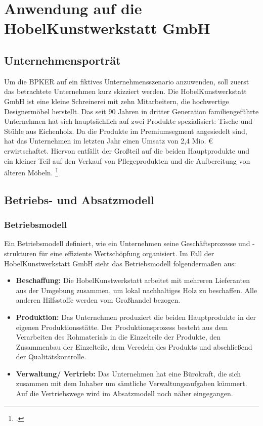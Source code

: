 \chapter{Anwendung auf die HobelKunstwerkstatt GmbH}

\section{Unternehmensporträt}

Um die BPKER auf ein fiktives Unternehmensszenario anzuwenden, soll zuerst das betrachtete Unternehmen kurz skizziert werden. Die HobelKunstwerkstatt GmbH ist eine kleine Schreinerei mit zehn Mitarbeitern, die hochwertige Designermöbel herstellt. Das seit 90 Jahren in dritter Generation familiengeführte Unternehmen hat sich hauptsächlich auf zwei Produkte spezialisiert: Tische und Stühle aus Eichenholz. Da die Produkte im Premiumsegment angesiedelt sind, hat das Unternehmen im letzten Jahr einen Umsatz von 2,4 Mio. {\euro} erwirtschaftet. Hiervon entfällt der Gro{\ss}teil auf die beiden Hauptprodukte und ein kleiner Teil auf den Verkauf von Pflegeprodukten und die Aufbereitung von älteren Möbeln. \footcite[Vgl.][Abfrage zu einem Unternehmensporträt für eine Case Study zur BPKER]{openai2022}

\section{Betriebs- und Absatzmodell}

\subsection{Betriebsmodell}

Ein Betriebsmodell definiert, wie ein Unternehmen seine Geschäftsprozesse und -strukturen für eine effiziente Wertschöpfung organisiert. Im Fall der HobelKunstwerkstatt GmbH sieht das Betriebsmodell folgenderma{\ss}en aus:

\begin{itemize}
    \item \textbf{Beschaffung:} Die HobelKunstwerkstatt arbeitet mit mehreren Lieferanten aus der Umgebung zusammen, um lokal nachhaltiges Holz zu beschaffen. Alle anderen Hilfsstoffe werden vom Gro{\ss}handel bezogen. 
    \item \textbf{Produktion:} Das Unternehmen produziert die beiden Hauptprodukte in der eigenen Produktionsstätte. Der Produktionsprozess besteht aus dem Verarbeiten des Rohmaterials in die Einzelteile der Produkte, den Zusammenbau der Einzelteile, dem Veredeln des Produkts und abschlie{\ss}end der Qualitätskontrolle.
    \item \textbf{Verwaltung/ Vertrieb:} Das Unternehmen hat eine Bürokraft, die sich zusammen mit dem Inhaber um sämtliche Verwaltungsaufgaben kümmert. Auf die Vertriebswege wird im Absatzmodell noch näher eingegangen.
\end{itemize}

